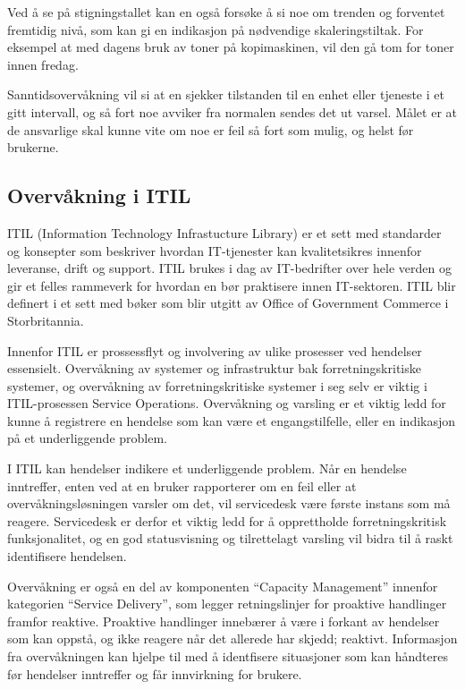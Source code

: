 Ved å se på stigningstallet kan en også forsøke å si noe om trenden og forventet fremtidig nivå, som kan gi en indikasjon på nødvendige skaleringstiltak. For eksempel at med dagens bruk av toner på kopimaskinen, vil den gå tom for toner innen fredag. 

Sanntidsovervåkning vil si at en sjekker tilstanden til en enhet eller tjeneste i et gitt intervall, og så fort noe avviker fra normalen sendes det ut varsel. Målet er at de ansvarlige skal kunne vite om noe er feil så fort som mulig, og helst før brukerne.

\subsection{Overvåkning i ITIL}
ITIL (Information Technology Infrastucture Library) er et sett med standarder og konsepter som beskriver hvordan IT-tjenester kan kvalitetsikres innenfor leveranse, drift og support. ITIL brukes i dag av IT-bedrifter over hele verden og gir et felles rammeverk for hvordan en bør praktisere innen IT-sektoren. ITIL blir definert i et sett med bøker som blir utgitt av Office of Government Commerce i Storbritannia.

Innenfor ITIL er prossessflyt og involvering av ulike prosesser ved hendelser essensielt. Overvåkning av systemer og infrastruktur bak forretningskritiske systemer, og overvåkning av forretningskritiske systemer i seg selv er viktig i ITIL-prosessen Service Operations. Overvåkning og varsling er et viktig ledd for kunne å registrere en hendelse som kan være et engangstilfelle, eller en indikasjon på et underliggende problem. 

I ITIL kan hendelser indikere et underliggende problem. Når en hendelse inntreffer, enten ved at en bruker rapporterer om en feil eller at overvåkningsløsningen varsler om det, vil servicedesk være første instans som må reagere. Servicedesk er derfor et viktig ledd for å opprettholde forretningskritisk funksjonalitet, og en god statusvisning og tilrettelagt varsling vil bidra til å raskt identifisere hendelsen.

Overvåkning er også en del av komponenten ``Capacity Management'' innenfor kategorien ``Service Delivery'', som legger retningslinjer for proaktive handlinger framfor reaktive. Proaktive handlinger innebærer å være i forkant av hendelser som kan oppstå, og ikke reagere når det allerede har skjedd; reaktivt. Informasjon fra overvåkningen kan hjelpe til med å identfisere situasjoner som kan håndteres før hendelser inntreffer og får innvirkning for brukere. \cite{itil1,itil2,events}

